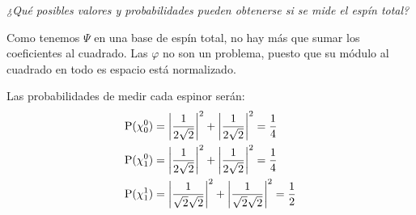 \begin{tcolorbox}[halign=left]
  \emph{¿Qué posibles valores y probabilidades pueden obtenerse si se
    mide el espín total?}
\end{tcolorbox}

Como tenemos $\Psi$ en una base de espín total, no hay más que sumar
los coeficientes al cuadrado. Las $\varphi$ no son un problema, puesto
que su módulo al cuadrado en todo es espacio está normalizado.

Las probabilidades de medir cada espinor serán:
\begin{align}
  \text{P}(\chi_0^0) &= \abs{\frac{1}{2\sqrt{2}}}^2 +
                       \abs{\frac{1}{2\sqrt{2}}}^2 = \frac{1}{4} \\
  \text{P}(\chi_1^0) &= \abs{\frac{1}{2\sqrt{2}}}^2 +
                       \abs{\frac{1}{2\sqrt{2}}}^2 = \frac{1}{4} \\
  \text{P}(\chi_1^1) &= \abs{\frac{1}{\sqrt{2}\sqrt{2}}}^2 +
                       \abs{\frac{1}{\sqrt{2}\sqrt{2}}}^2 = \frac{1}{2}
\end{align}

